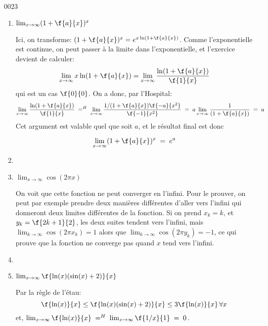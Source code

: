 \begin{corrige}{0023}
\begin{alternative}
\begin{enumerate}
		\item $ \lim_{x\rightarrow  \infty}(1+\f{a}{x})^x$ \hs
		 
		Ici, on transforme: $ (1+\f{a}{x})^x = e^{x\ln(1+\f{a}{x})}$. Comme l'exponentielle est continue, on peut passer à la limite dans l'exponentielle, et l'exercice devient de calculer:
		 \[\lim_{x\rightarrow  \infty}x\ln(1+\f{a}{x}) = \lim_{x\rightarrow  \infty}\dfrac{\ln(1+\f{a}{x})}{\f{1}{x}}\]
		qui est un cas $\f{0}{0}$. On a donc, par l'Hospital:
		  \[\lim_{x\rightarrow  \infty}\dfrac{\ln(1+\f{a}{x})}{\f{1}{x}} \; =^H\;   \lim_{x\rightarrow  \infty}\dfrac{1/(1+\f{a}{x})\f{-a}{x^2}}{\f{-1}{x^2}} \; = \;      a\lim_{x\rightarrow  \infty}\dfrac{1}{(1+\f{a}{x})}   \;=\; a       \]
		Cet argument est valable quel que soit $a$, et le résultat final est donc  
		 
		 \[ \lim_{x\rightarrow  \infty}(1+\f{a}{x})^x \;= \; e^a\] 
		 
		\item

		 \item $\lim_{x\rightarrow \infty} \cos(2\pi x)$\hs
		 
		 On voit que cette fonction ne peut converger en l'infini. Pour le prouver, on peut par exemple prendre deux manières différentes d'aller vers l'infini qui donneront deux limites différentes de la fonction. 
		Si on prend $x_k=k$, et $y_k = \f{2k+1}{2}$, les deux suites tendent vers l'infini, mais  
		 $\lim_{k\rightarrow \infty} \cos(2\pi x_k) = 1$ alors que $\lim_{k\rightarrow \infty} \cos(2\pi y_k) =  -1$, ce qui prouve que la fonction ne converge pas quand $x$ tend vers l'infini.
		 
		\item 

		  \item $\lim_{x\rightarrow \infty} \f{\ln(x)(\sin(x)+2)}{x}$\hs
		 
		 Par la règle de l'étau:\[\f{\ln(x)}{x} \leq \f{\ln(x)(\sin(x)+2)}{x} \leq 3\f{\ln(x)}{x} \, \forall x\]
		 et, $\lim_{x\rightarrow \infty} \f{\ln(x)}{x} \; =^H \; \lim_{x\rightarrow \infty} \f{1/x}{1}  \;=\;0$.
		 
	\end{enumerate}
\end{alternative}

\end{corrige}
